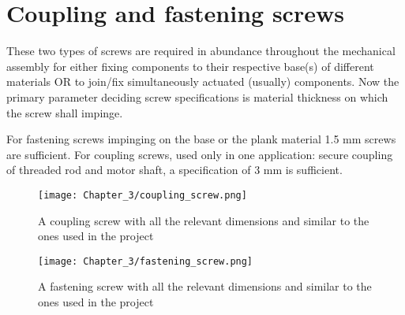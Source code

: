 \section{Coupling and fastening screws} \label{screws}
These two types of screws are required in abundance throughout the mechanical assembly for either fixing components to their respective base(s) of different materials OR to join/fix simultaneously actuated (usually) components. Now the primary parameter deciding screw specifications is material thickness on which the screw shall impinge. \par

For fastening screws impinging on the base or the plank material 1.5 mm screws are sufficient. For coupling screws, used only in one application: secure coupling of threaded rod and motor shaft, a specification of 3 mm is sufficient.

\begin{figure}[h]
    \centering
    \texttt{[image: Chapter\_3/coupling\_screw.png]}
    \caption{A coupling screw with all the relevant dimensions and similar to the ones used in the project}
    \label{fig:cscrew}
\end{figure} \pagebreak

\begin{figure}[h]
    \centering
    \texttt{[image: Chapter\_3/fastening\_screw.png]}
    \caption{A fastening screw with all the relevant dimensions and similar to the ones used in the project}
    \label{fig:fscrew}
\end{figure}



